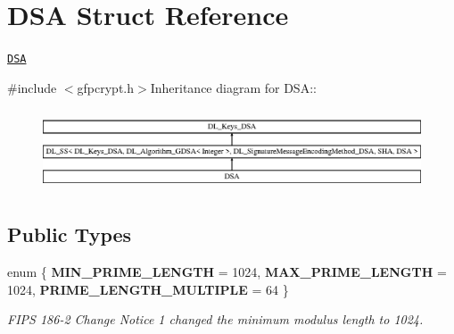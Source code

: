 \hypertarget{struct_d_s_a}{
\section{DSA Struct Reference}
\label{struct_d_s_a}
}


\href{http://www.weidai.com/scan-mirror/sig.html#DSA}{\tt DSA}  


{\ttfamily \#include $<$gfpcrypt.h$>$}Inheritance diagram for DSA::\begin{figure}[H]
\begin{center}
\leavevmode
\includegraphics[height=2.42775cm]{struct_d_s_a}
\end{center}
\end{figure}
\subsection*{Public Types}
\begin{DoxyCompactItemize}
\item 
enum \{ {\bfseries MIN\_\-PRIME\_\-LENGTH} =  1024, 
{\bfseries MAX\_\-PRIME\_\-LENGTH} =  1024, 
{\bfseries PRIME\_\-LENGTH\_\-MULTIPLE} =  64
 \}
\begin{DoxyCompactList}\small\item\em FIPS 186-\/2 Change Notice 1 changed the minimum modulus length to 1024. \item\end{DoxyCompactList}\end{DoxyCompactItemize}

